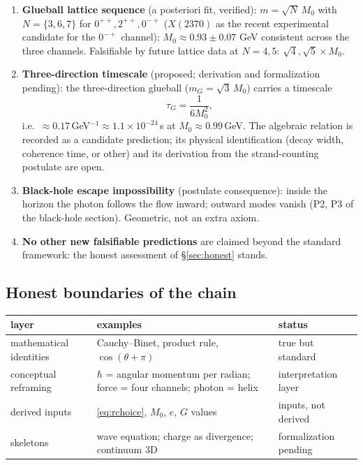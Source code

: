 \documentclass[aps,prd,preprint,superscriptaddress,amsmath,amssymb]{revtex4-2}
\begin{document}
\begin{enumerate}
\item \textbf{Glueball lattice sequence} (a posteriori fit, verified):
$m=\sqrt N\,M_0$ with $N=\{3,6,7\}$ for $0^{++},2^{++},0^{-+}$
\cite{morningstar1999glueball,chen2006glueball,navas2024review,besiii2026lightest}
($X(2370)$ as the recent experimental candidate for the $0^{-+}$ channel);
$M_0\approx0.93\pm0.07$ GeV
consistent across the three channels.  Falsifiable by future lattice data
at $N=4,5$: $\sqrt4,\sqrt5\times M_0$.
\item \textbf{Three-direction timescale} (proposed; derivation and
formalization pending): the three-direction glueball
($m_G=\sqrt3\,M_0$) carries a timescale
\begin{equation}
\tau_G=\frac{1}{6M_0^2},
\label{eq:taug}
\end{equation}
i.e.\ $\approx0.17$\,GeV${}^{-1}\approx1.1\times10^{-24}$\,s at
$M_0\approx0.99$\,GeV.  The algebraic relation is recorded as a candidate
prediction; its physical identification (decay width, coherence time, or
other) and its derivation from the strand-counting postulate are open.
\item \textbf{Black-hole escape impossibility} (postulate consequence):
inside the horizon the photon follows the flow inward; outward modes
vanish (P2, P3 of the black-hole section).  Geometric, not an extra
axiom.
\item \textbf{No other new falsifiable predictions} are claimed beyond
the standard framework: the honest assessment of \S\ref{sec:honest}
stands.
\end{enumerate}

\subsection{Honest boundaries of the chain}
\label{app:boundaries}

\begin{center}
\begin{tabular}{l p{7cm} p{3.5cm}}
\toprule
layer & examples & status \\
\midrule
mathematical identities & Cauchy--Binet, product rule, $\cos(\theta+\pi)$ &
true but standard \\
conceptual reframing & $\hbar$ = angular momentum per radian; force = four
channels; photon = helix & interpretation layer \\
derived inputs & \eqref{eq:rchoice}, $M_0$, $e$, $G$ values & inputs, not
derived \\
skeletons & wave equation; charge as divergence; continuum 3D &
formalization pending \\
\bottomrule
\end{tabular}
\end{center}


\end{document}
